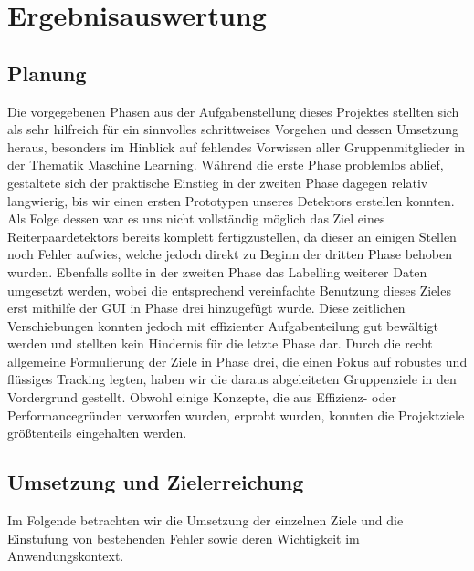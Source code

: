 \chapter{Ergebnisauswertung}
\label{ch:ergebnis}


\section{Planung}
Die vorgegebenen Phasen aus der Aufgabenstellung dieses Projektes stellten sich als sehr hilfreich für ein sinnvolles schrittweises Vorgehen und dessen Umsetzung heraus, besonders im Hinblick auf fehlendes Vorwissen aller Gruppenmitglieder in der Thematik Maschine Learning. Während die erste Phase problemlos ablief, gestaltete sich der praktische Einstieg in der zweiten Phase dagegen relativ langwierig, bis wir einen ersten Prototypen unseres Detektors erstellen konnten. Als Folge dessen war es uns nicht vollständig möglich das Ziel eines Reiterpaardetektors bereits komplett fertigzustellen, da dieser an einigen Stellen noch Fehler aufwies, welche jedoch direkt zu Beginn der dritten Phase behoben wurden. Ebenfalls sollte in der zweiten Phase das Labelling weiterer Daten umgesetzt werden, wobei die entsprechend vereinfachte Benutzung dieses Zieles erst mithilfe der GUI in Phase drei hinzugefügt wurde. Diese zeitlichen Verschiebungen konnten jedoch  mit effizienter Aufgabenteilung gut bewältigt werden und stellten kein Hindernis für die letzte Phase dar.
Durch die recht allgemeine Formulierung der Ziele in Phase drei, die einen Fokus auf robustes und flüssiges Tracking legten, haben wir die daraus abgeleiteten Gruppenziele in den Vordergrund gestellt. Obwohl einige Konzepte, die aus Effizienz- oder Performancegründen verworfen wurden, erprobt wurden, konnten die Projektziele größtenteils eingehalten werden. 

\section{Umsetzung und Zielerreichung}
Im Folgende betrachten wir die Umsetzung der einzelnen Ziele und die Einstufung von bestehenden Fehler sowie deren Wichtigkeit im Anwendungskontext.




